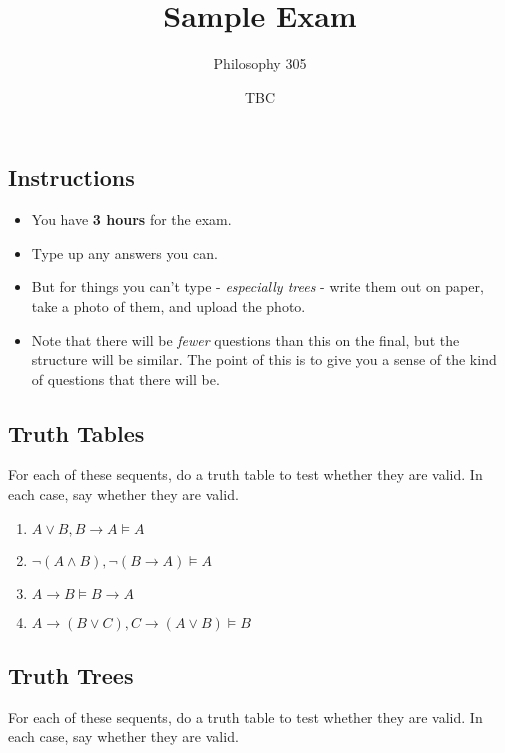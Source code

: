 \documentclass[
  11pt,
]{article}
\title{Sample Exam}
\author{Philosophy 305}
\date{TBC}
\providecommand{\tightlist}{%
  \setlength{\itemsep}{0pt}\setlength{\parskip}{0pt}}
\begin{document}
\maketitle

\hypertarget{instructions}{%
\subsection{Instructions}\label{instructions}}

\begin{itemize}
\tightlist
\item
  You have \textbf{3 hours} for the exam.
\item
  Type up any answers you can.
\item
  But for things you can't type - \emph{especially trees} - write them
  out on paper, take a photo of them, and upload the photo.
\item
  Note that there will be \emph{fewer} questions than this on the final,
  but the structure will be similar. The point of this is to give you a
  sense of the kind of questions that there will be.
\end{itemize}

\hypertarget{truth-tables}{%
\subsection{Truth Tables}\label{truth-tables}}

For each of these sequents, do a truth table to test whether they are
valid. In each case, say whether they are valid.

\begin{enumerate}
\def\labelenumi{\arabic{enumi}.}
\tightlist
\item
  \(A \vee B, B \rightarrow A \vDash A\)
\item
  \(\neg (A \wedge B), \neg (B \rightarrow A) \vDash A\)
\item
  \(A \rightarrow B \vDash B \rightarrow A\)
\item
  \(A \rightarrow (B \vee C), C \rightarrow (A \vee B) \vDash B\)
\end{enumerate}

\hypertarget{truth-trees}{%
\subsection{Truth Trees}\label{truth-trees}}

For each of these sequents, do a truth table to test whether they are
valid. In each case, say whether they are valid.
\end{document}

